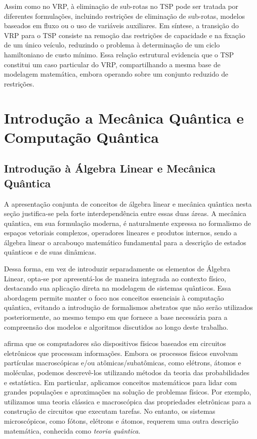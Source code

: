 Assim como no VRP, à eliminação de sub-rotas no TSP pode ser tratada por diferentes formulações, incluindo restrições de eliminação de sub-rotas, modelos baseados em fluxo ou o uso de variáveis auxiliares. Em síntese, a transição do VRP para o TSP consiste na remoção das restrições de capacidade e na fixação de um único veículo, reduzindo o problema à determinação de um ciclo hamiltoniano de custo mínimo. Essa relação estrutural evidencia que o TSP constitui um caso particular do VRP, compartilhando a mesma base de modelagem matemática, embora operando sobre um conjunto reduzido de restrições.

\section{Introdução a Mecânica Quântica e Computação Quântica}

\subsection{Introdução à Álgebra Linear e Mecânica Quântica}

A apresentação conjunta de conceitos de álgebra linear e mecânica quântica nesta seção justifica-se pela forte interdependência entre essas duas áreas. A mecânica quântica, em sua formulação moderna, é naturalmente expressa no formalismo de espaços vetoriais complexos, operadores lineares e produtos internos, sendo a álgebra linear o arcabouço matemático fundamental para a descrição de estados quânticos e de suas dinâmicas.

Dessa forma, em vez de introduzir separadamente os elementos de Álgebra Linear, opta-se por apresentá-los de maneira integrada ao contexto físico, destacando sua aplicação direta na modelagem de sistemas quânticos. Essa abordagem permite manter o foco nos conceitos essenciais à computação quântica, evitando a introdução de formalismos abstratos que não serão utilizados posteriormente, ao mesmo tempo em que fornece a base necessária para a compreensão dos modelos e algoritmos discutidos ao longo deste trabalho.

\textcite{Schuld2021} afirma que os computadores são dispositivos físicos baseados em circuitos eletrônicos que processam informações. Embora os processos físicos envolvam partículas macroscópicas e/ou atômicas/subatômicas, como elétrons, átomos e moléculas, podemos descrevê-los utilizando métodos da teoria das probabilidades e estatística. Em particular, aplicamos conceitos matemáticos para lidar com grandes populações e aproximações na solução de problemas físicos. Por exemplo, utilizamos uma teoria clássica e macroscópica das propriedades eletrônicas para a construção de circuitos que executam tarefas. No entanto, os sistemas microscópicos, como fótons, elétrons e átomos, requerem uma outra descrição matemática, conhecida como \textit{teoria quântica}.


